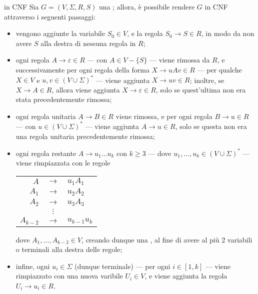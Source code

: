 \documentclass[a4paper, 12pt]{report}
\begin{document}
    \begin{framedmeth}[label={cfg into cnf}, breakable]{\CFG in CNF}
        Sia $G = (V, \Sigma, R, S)$ una \CFG; allora, è possibile rendere $G$ in CNF attraverso i seguenti passaggi:

        \begin{itemize}
            \item vengono aggiunte la variabile $S_0 \in V$, e la regola $S_0 \to S \in R$, in modo da non avere $S$ alla destra di nessuna regola in $R$;
            \item ogni regola $A \to \varepsilon \in R$ --- con $A \in V - \{S\}$ --- viene rimossa da $R$, e successivamente per ogni regola della forma $X \to uAv \in R$ --- per qualche $X \in V$ e $u, v \in (V \cup \Sigma)^*$ --- viene aggiunta $X \to uv \in R$; inoltre, se $X \to A \in R$, allora viene aggiunta $X \to \varepsilon \in R$, solo se quest'ultima non era stata precedentemente rimossa;
            \item ogni regola unitaria $A \to B \in R$ viene rimossa, e per ogni regola $B \to u \in R$ --- con $u \in (V \cup \Sigma)^*$ --- viene aggiunta $A \to u \in R$, solo se questa non era una regola unitaria precedentemente rimossa;
            \item ogni regola restante $A \to u_1 \ldots u_k$ con $k \ge 3$ --- dove $u_1, \ldots, u_k \in (V \cup \Sigma)^*$ --- viene rimpiazzata con le regole

                \begin{center}
                    \begin{tabular}{rcl}
                        $A$ & $\to$ & $u_1 A_1$ \\
                        $A_1$ & $\to$ & $u_2 A_2$ \\
                        $A_2$ & $\to$ & $u_3 A_3$ \\
                              & $\vdots$ & \\
                        $A_{k - 2}$ & $\to$ & $u_{k - 1}u_k$
                    \end{tabular}
                \end{center}

                dove $A_1, \ldots, A_{k - 2} \in V$, creando dunque una , al fine di avere al più 2 variabili o terminali alla destra delle regole;
            \item infine, ogni $u_i \in \Sigma$ (dunque terminale) --- per ogni $i \in [1, k]$ --- viene rimpiazzato con una nuova varibile $U_i \in V$, e viene aggiunta la regola $U_i \to u_i \in R$.
        \end{itemize}
    \end{framedmeth}
\end{document}
